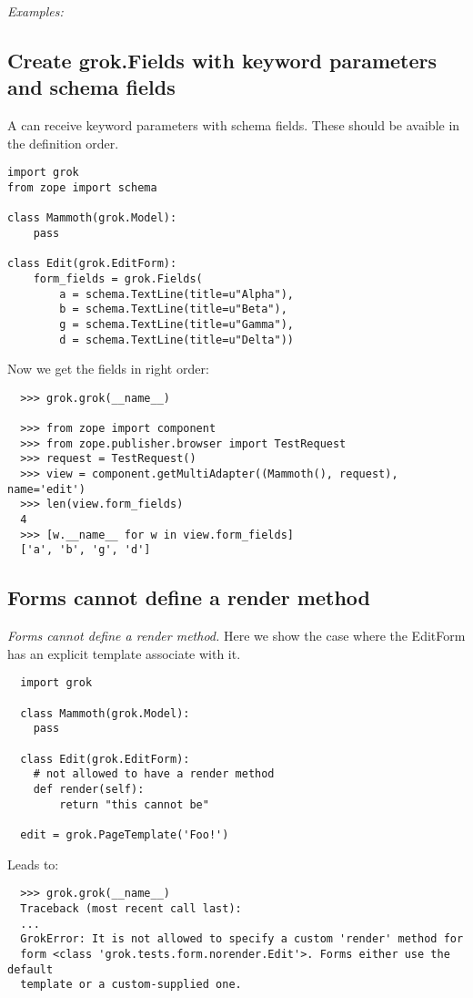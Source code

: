     \emph{Examples:}

    \subsection{Create grok.Fields with keyword parameters and schema fields}

    A  can receive keyword parameters with schema
    fields.  These should be avaible in the definition order.

\begin{verbatim}
import grok
from zope import schema

class Mammoth(grok.Model):
    pass

class Edit(grok.EditForm):
    form_fields = grok.Fields(
        a = schema.TextLine(title=u"Alpha"),
        b = schema.TextLine(title=u"Beta"),
        g = schema.TextLine(title=u"Gamma"),
        d = schema.TextLine(title=u"Delta"))
\end{verbatim}
Now we get the fields in right order:
\begin{verbatim}
  >>> grok.grok(__name__)

  >>> from zope import component
  >>> from zope.publisher.browser import TestRequest
  >>> request = TestRequest()
  >>> view = component.getMultiAdapter((Mammoth(), request), name='edit')
  >>> len(view.form_fields)
  4
  >>> [w.__name__ for w in view.form_fields]
  ['a', 'b', 'g', 'd']
\end{verbatim}
    
    \subsection{Forms cannot define a render method}

    \emph{Forms cannot define a render method.} Here we show the case
    where the EditForm has an explicit template associate with it. 

\begin{verbatim}
  import grok

  class Mammoth(grok.Model):
    pass

  class Edit(grok.EditForm):
    # not allowed to have a render method
    def render(self):
        return "this cannot be"

  edit = grok.PageTemplate('Foo!')
\end{verbatim}
Leads to:
\begin{verbatim}
  >>> grok.grok(__name__)
  Traceback (most recent call last):
  ...
  GrokError: It is not allowed to specify a custom 'render' method for
  form <class 'grok.tests.form.norender.Edit'>. Forms either use the default
  template or a custom-supplied one.
\end{verbatim}





